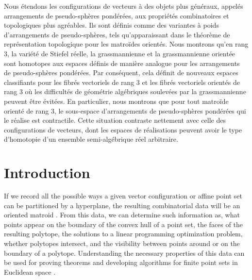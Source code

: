 \documentclass[JEP,XML,SOM,Unicode,NoFloatCountersInSection,published]{cedram}
\theoremstyle{remark}
\begin{document}
\begin{altabstract}
Nous étendons les configurations de vecteurs à des objets plus généraux, appelés arrangements de pseudo-sphères pondérées, aux propriétés combinatoires et topologiques plus agréables. Ils sont définis comme des variantes à poids d'arrangements de pseudo-sphères, tels qu'apparaissant dans le théorème de représentation topologique pour les matroïdes orientés. Nous montrons qu'en rang $3$, la variété de Stiefel réelle, la grassmannienne et la grassmannienne orientée sont homotopes aux espaces définis de manière analogue pour les arrangements de pseudo-sphères pondérées. Par conséquent, cela définit de nouveaux espaces classifiants pour les fibrés vectoriels de rang $3$ et les fibrés vectoriels orientés de rang $3$ où les difficultés de géométrie algébriques soulevées par la grassmannienne peuvent être évitées. En particulier, nous montrons que pour tout matroïde orienté de rang $3$, le sous-espace d'arrangements de pseudo-sphères pondérées qui le réalise est contractile. Cette situation contraste nettement avec celle des configurations de vecteurs, dont les espaces de réalisations peuvent avoir le type d'homotopie d'un ensemble semi-algébrique réel arbitraire.
\end{altabstract}

\maketitle
\vspace*{-2\baselineskip}\enlargethispage{\baselineskip}
\tableofcontents
\mainmatter

\section{Introduction}

If we record all the possible ways a given vector configuration or affine point set can be partitioned by a hyperplane, the resulting combinatorial data will be an oriented matroid \cite{bjorner1999oriented}.
From this data, we can determine such information as, what points appear on the boundary of the convex hull of a point set, the faces of the resulting polytope, the solutions to a linear programming optimization problem, whether polytopes intersect, and the visibility between points around or on the boundary of a polytope.
Understanding the necessary properties of this data can be used for proving theorems and developing algorithms for finite point sets in Euclidean space \cite{oswin2013,cardinal2019subquadratic,DobHolHub2014Erdos,habert2012,knuth1992axioms,novick1,novick2,shnurnikov2016tk}.
\end{document}
